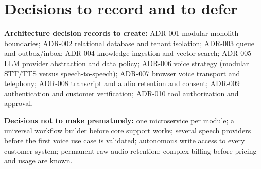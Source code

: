 \section{Decisions to record and to defer}
\textbf{Architecture decision records to create:} ADR-001 modular monolith boundaries; ADR-002 relational database and tenant isolation; ADR-003 queue and outbox/inbox; ADR-004 knowledge ingestion and vector search; ADR-005 LLM provider abstraction and data policy; ADR-006 voice strategy (modular STT/TTS versus speech-to-speech); ADR-007 browser voice transport and telephony; ADR-008 transcript and audio retention and consent; ADR-009 authentication and customer verification; ADR-010 tool authorization and approval.

\textbf{Decisions not to make prematurely:} one microservice per module; a universal workflow builder before core support works; several speech providers before the first voice use case is validated; autonomous write access to every customer system; permanent raw audio retention; complex billing before pricing and usage are known.

